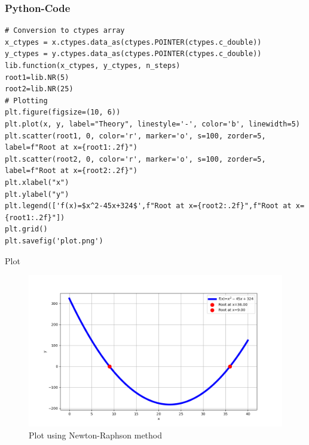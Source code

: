 \documentclass{beamer}
\begin{document}
\begin{frame}[fragile]
\frametitle{Python-Code}
\begin{verbatim}
# Conversion to ctypes array
x_ctypes = x.ctypes.data_as(ctypes.POINTER(ctypes.c_double))
y_ctypes = y.ctypes.data_as(ctypes.POINTER(ctypes.c_double))
lib.function(x_ctypes, y_ctypes, n_steps)
root1=lib.NR(5)
root2=lib.NR(25)
# Plotting
plt.figure(figsize=(10, 6))
plt.plot(x, y, label="Theory", linestyle='-', color='b', linewidth=5)
plt.scatter(root1, 0, color='r', marker='o', s=100, zorder=5, label=f"Root at x={root1:.2f}")
plt.scatter(root2, 0, color='r', marker='o', s=100, zorder=5, label=f"Root at x={root2:.2f}")
plt.xlabel("x")
plt.ylabel("y")
plt.legend(['f(x)=$x^2-45x+324$',f"Root at x={root2:.2f}",f"Root at x={root1:.2f}"])
plt.grid()
plt.savefig('plot.png')
\end{verbatim}
\end{frame}
\begin{frame}{Plot}
    \begin{figure}[h]
\centering
\includegraphics[width=\columnwidth]{figs/Q5.png}
\caption{Plot using Newton-Raphson method}
\label{fig:Plot1} 
\end{figure}
\end{frame}
\end{document}

